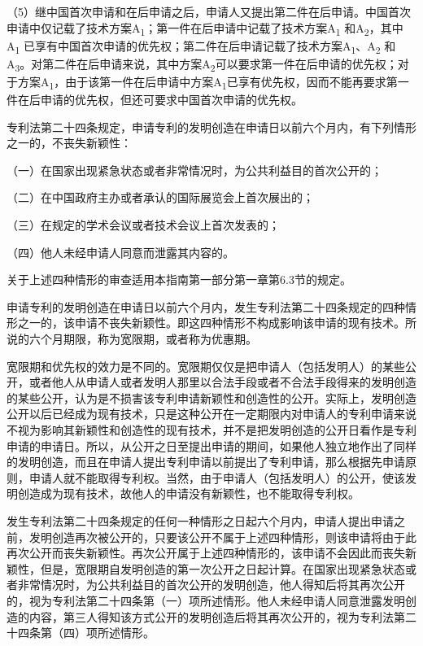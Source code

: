 {\setlength{\parindent}{17.1bp}（5）继中国首次申请和在后申请之后，申请人又提出第二件在后申请。中国首次申请中仅记载了技术方案A\textsubscript{1}；第一件在后申请中记载了技术方案A\textsubscript{1} 和A\textsubscript{2}，其中A\textsubscript{1} 已享有中国首次申请的优先权；第二件在后申请记载了技术方案A\textsubscript{1}、A\textsubscript{2} 和A\textsubscript{3}。对第二件在后申请来说，其中方案A\textsubscript{2}可以要求第一件在后申请的优先权；对于方案A\textsubscript{1}，由于该第一件在后申请中方案A\textsubscript{1}已享有优先权，因而不能再要求第一件在后申请的优先权，但还可要求中国首次申请的优先权。\par}

专利法第二十四条规定，申请专利的发明创造在申请日以前六个月内，有下列情形之一的，不丧失新颖性：

{\setlength{\parindent}{17.1bp}（一）在国家出现紧急状态或者非常情况时，为公共利益目的首次公开的；\par}

{\setlength{\parindent}{17.1bp}（二）在中国政府主办或者承认的国际展览会上首次展出的；\par}

{\setlength{\parindent}{17.1bp}（三）在规定的学术会议或者技术会议上首次发表的；\par}

{\setlength{\parindent}{17.1bp}（四）他人未经申请人同意而泄露其内容的。\par}

关于上述四种情形的审查适用本指南第一部分第一章第6.3节的规定。

申请专利的发明创造在申请日以前六个月内，发生专利法第二十四条规定的四种情形之一的，该申请不丧失新颖性。即这四种情形不构成影响该申请的现有技术。所说的六个月期限，称为宽限期，或者称为优惠期。

宽限期和优先权的效力是不同的。宽限期仅仅是把申请人（包括发明人）的某些公开，或者他人从申请人或者发明人那里以合法手段或者不合法手段得来的发明创造的某些公开，认为是不损害该专利申请新颖性和创造性的公开。实际上，发明创造公开以后已经成为现有技术，只是这种公开在一定期限内对申请人的专利申请来说不视为影响其新颖性和创造性的现有技术，并不是把发明创造的公开日看作是专利申请的申请日。所以，从公开之日至提出申请的期间，如果他人独立地作出了同样的发明创造，而且在申请人提出专利申请以前提出了专利申请，那么根据先申请原则，申请人就不能取得专利权。当然，由于申请人（包括发明人）的公开，使该发明创造成为现有技术，故他人的申请没有新颖性，也不能取得专利权。

发生专利法第二十四条规定的任何一种情形之日起六个月内，申请人提出申请之前，发明创造再次被公开的，只要该公开不属于上述四种情形，则该申请将由于此再次公开而丧失新颖性。再次公开属于上述四种情形的，该申请不会因此而丧失新颖性，但是，宽限期自发明创造的第一次公开之日起计算。在国家出现紧急状态或者非常情况时，为公共利益目的首次公开的发明创造，他人得知后将其再次公开的，视为专利法第二十四条第（一）项所述情形。他人未经申请人同意泄露发明创造的内容，第三人得知该方式公开的发明创造后将其再次公开的，视为专利法第二十四条第（四）项所述情形。

